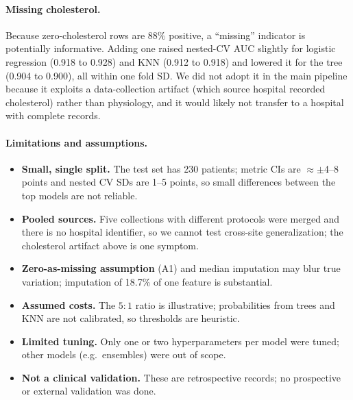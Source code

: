 \documentclass[12pt,a4paper]{article}
\begin{document}
\paragraph{Missing cholesterol.} Because zero-cholesterol rows are $88\%$ positive, a ``missing'' indicator is potentially informative. Adding one raised nested-CV AUC slightly for logistic regression (0.918 to 0.928) and KNN (0.912 to 0.918) and lowered it for the tree (0.904 to 0.900), all within one fold SD. We did not adopt it in the main pipeline because it exploits a data-collection artifact (which source hospital recorded cholesterol) rather than physiology, and it would likely not transfer to a hospital with complete records.

\paragraph{Limitations and assumptions.}
\begin{itemize}[leftmargin=2em,itemsep=0pt]
\item \textbf{Small, single split.} The test set has 230 patients; metric CIs are $\approx\pm$4--8 points and nested CV SDs are 1--5 points, so small differences between the top models are not reliable.
\item \textbf{Pooled sources.} Five collections with different protocols were merged and there is no hospital identifier, so we cannot test cross-site generalization; the cholesterol artifact above is one symptom.
\item \textbf{Zero-as-missing assumption} (A1) and median imputation may blur true variation; imputation of 18.7\% of one feature is substantial.
\item \textbf{Assumed costs.} The $5{:}1$ ratio is illustrative; probabilities from trees and KNN are not calibrated, so thresholds are heuristic.
\item \textbf{Limited tuning.} Only one or two hyperparameters per model were tuned; other models (e.g.\ ensembles) were out of scope.
\item \textbf{Not a clinical validation.} These are retrospective records; no prospective or external validation was done.
\end{itemize}
\end{document}
